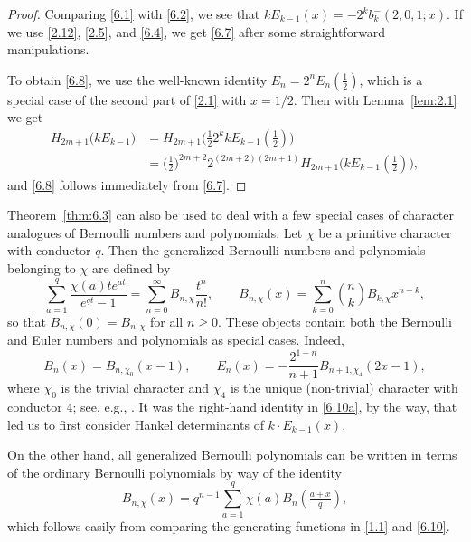 \documentclass{amsart}
\theoremstyle{plain}
\numberwithin{equation}{section}
\begin{document}
\begin{proof}
Comparing \eqref{6.1} with \eqref{6.2}, we see that
$kE_{k-1}(x)=-2^kb_k^{-}(2,0,1;x)$. If we use \eqref{2.12}, \eqref{2.5}, and 
\eqref{6.4}, we get \eqref{6.7} after some straightforward manipulations.

To obtain \eqref{6.8}, we use the well-known identity $E_n=2^nE_n(\frac{1}{2})$,
which is a special case of the second part of \eqref{2.1} with $x=1/2$. Then 
with Lemma~\ref{lem:2.1} we get
\begin{align*}
H_{2m+1}\big(kE_{k-1}\big)
&=H_{2m+1}\big(\tfrac{1}{2}2^kkE_{k-1}(\tfrac{1}{2})\big) \\
&=\big(\tfrac{1}{2}\big)^{2m+2}2^{(2m+2)(2m+1)}
H_{2m+1}\big(kE_{k-1}(\tfrac{1}{2})\big),
\end{align*}
and \eqref{6.8} follows immediately from \eqref{6.7}.
\end{proof}

Theorem~\ref{thm:6.3} can also be used to deal with a few special cases of
character analogues of Bernoulli numbers and polynomials. Let $\chi$ be a 
primitive character with conductor $q$. Then the generalized Bernoulli numbers
and polynomials belonging to $\chi$ are defined by
\begin{equation}\label{6.10}
\sum_{a=1}^q\frac{\chi(a)te^{at}}{e^{qt}-1} 
= \sum_{n=0}^\infty B_{n,\chi}\frac{t^n}{n!},\qquad
B_{n,\chi}(x) = \sum_{k=0}^n\binom{n}{k}B_{k,\chi}x^{n-k},
\end{equation}
so that $B_{n,\chi}(0)=B_{n,\chi}$ for all $n\geq 0$.
These objects contain both the Bernoulli and Euler numbers and polynomials as
special cases. Indeed,
\begin{equation}\label{6.10a}
B_n(x)=B_{n,\chi_{0}}(x-1),\qquad
E_{n}(x)=-\frac{2^{1-n}}{n+1}B_{n+1,\chi_{4}}(2x-1),
\end{equation}
where $\chi_{0}$ is the trivial character and $\chi_{4}$ is the unique (non-trivial)
character with conductor 4; see, e.g., \cite[Sect.~24.16(ii)]{DLMF}. 
It was the right-hand identity in \eqref{6.10a}, by the way, that led us to 
first consider Hankel determinants of $k\cdot E_{k-1}(x)$.

On the other hand, all
generalized Bernoulli polynomials can be written in terms of the ordinary
Bernoulli polynomials by way of the identity
\begin{equation}\label{6.11}
B_{n,\chi}(x) = q^{n-1}\sum_{a=1}^q\chi(a)B_n(\tfrac{a+x}{q}),
\end{equation}
which follows easily from comparing the generating functions in \eqref{1.1} and
\eqref{6.10}. 
\end{document}
